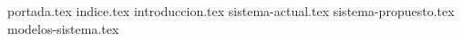 \documentclass[12pt]{article}
\begin{document}
{portada.tex}
{indice.tex}
{introduccion.tex}
{sistema-actual.tex}
{sistema-propuesto.tex}
{modelos-sistema.tex}
\end{document}
